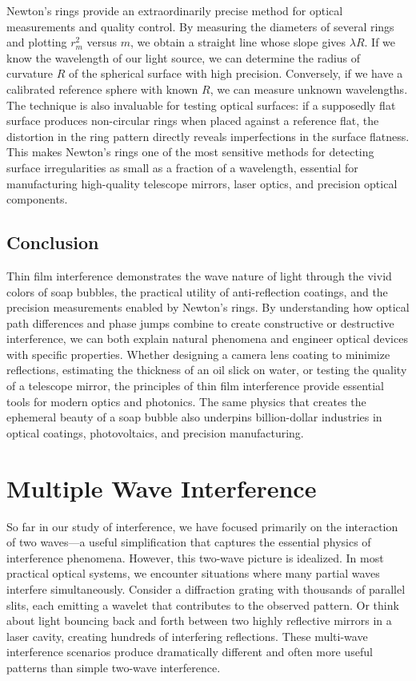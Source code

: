 \documentclass[
  a4paper,
]{book}
\begin{document}
Newton's rings provide an extraordinarily precise method for optical
measurements and quality control. By measuring the diameters of several
rings and plotting \(r_m^2\) versus \(m\), we obtain a straight line
whose slope gives \(\lambda R\). If we know the wavelength of our light
source, we can determine the radius of curvature \(R\) of the spherical
surface with high precision. Conversely, if we have a calibrated
reference sphere with known \(R\), we can measure unknown wavelengths.
The technique is also invaluable for testing optical surfaces: if a
supposedly flat surface produces non-circular rings when placed against
a reference flat, the distortion in the ring pattern directly reveals
imperfections in the surface flatness. This makes Newton's rings one of
the most sensitive methods for detecting surface irregularities as small
as a fraction of a wavelength, essential for manufacturing high-quality
telescope mirrors, laser optics, and precision optical components.

\section{Conclusion}\label{conclusion-3}

Thin film interference demonstrates the wave nature of light through the
vivid colors of soap bubbles, the practical utility of anti-reflection
coatings, and the precision measurements enabled by Newton's rings. By
understanding how optical path differences and phase jumps combine to
create constructive or destructive interference, we can both explain
natural phenomena and engineer optical devices with specific properties.
Whether designing a camera lens coating to minimize reflections,
estimating the thickness of an oil slick on water, or testing the
quality of a telescope mirror, the principles of thin film interference
provide essential tools for modern optics and photonics. The same
physics that creates the ephemeral beauty of a soap bubble also
underpins billion-dollar industries in optical coatings, photovoltaics,
and precision manufacturing.

\chapter{Multiple Wave Interference}\label{multiple-wave-interference}

So far in our study of interference, we have focused primarily on the
interaction of two waves---a useful simplification that captures the
essential physics of interference phenomena. However, this two-wave
picture is idealized. In most practical optical systems, we encounter
situations where many partial waves interfere simultaneously. Consider a
diffraction grating with thousands of parallel slits, each emitting a
wavelet that contributes to the observed pattern. Or think about light
bouncing back and forth between two highly reflective mirrors in a laser
cavity, creating hundreds of interfering reflections. These multi-wave
interference scenarios produce dramatically different and often more
useful patterns than simple two-wave interference.
\end{document}
